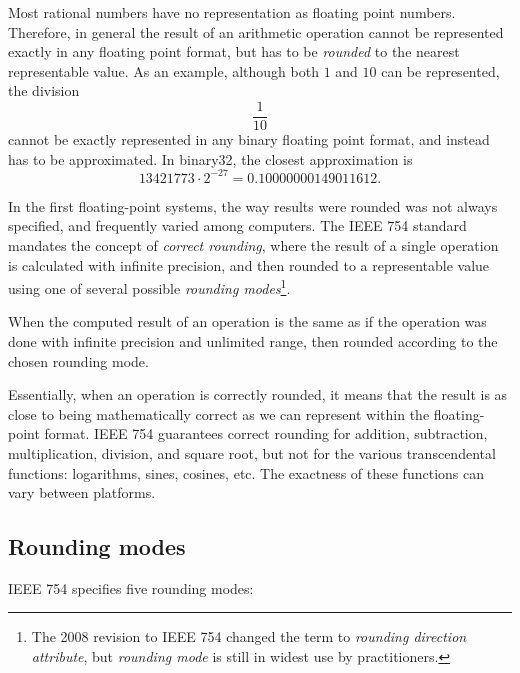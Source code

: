 Most rational numbers have no representation as floating point
numbers.  Therefore, in general the result of an arithmetic operation
cannot be represented exactly in any floating point format, but has to
be \emph{rounded} to the nearest representable value.  As an example,
although both $1$ and $10$ can be represented, the division
\[
  \frac{1}{10}
\]
cannot be exactly represented in any binary floating point format, and
instead has to be approximated.  In binary32, the closest
approximation is
\[
  13421773 \cdot 2^{-27} = 0.10000000149011612.
\]

In the first floating-point systems, the way results were rounded was
not always specified, and frequently varied among computers.  The IEEE
754 standard mandates the concept of \emph{correct rounding}, where
the result of a single operation is calculated with infinite
precision, and then rounded to a representable value using one of
several possible \emph{rounding modes}\footnote{The 2008 revision to
  IEEE 754 changed the term to \emph{rounding direction attribute},
  but \emph{rounding mode} is still in widest use by practitioners.}.

\begin{definition}
  When the computed result of an operation is the same as if the
  operation was done with infinite precision and unlimited range, then
  rounded according to the chosen rounding mode.
\end{definition}

Essentially, when an operation is correctly rounded, it means that the
result is as close to being mathematically correct as we can represent
within the floating-point format.  IEEE 754 guarantees correct
rounding for addition, subtraction, multiplication, division, and
square root, but not for the various transcendental functions:
logarithms, sines, cosines, etc.  The exactness of these functions can
vary between platforms.

\subsection{Rounding modes}

IEEE 754 specifies five rounding modes:


